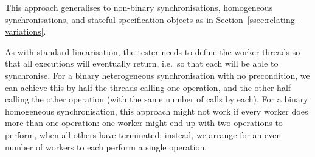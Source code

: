 
This approach generalises to non-binary synchronisations, homogeneous
synchronisations, and stateful specification objects as in
Section~\ref{ssec:relating-variations}.


As with standard linearisation, the tester needs to define the worker threads
so that all executions will eventually return, i.e.~so that each will be able
to synchronise.  For a binary heterogeneous synchronisation with no
precondition, we can achieve this by half the threads calling one operation,
and the other half calling the other operation (with the same number of calls
by each).  For a binary homogeneous synchronisation, this approach might not
work if every worker does more than one operation: one worker might end up
with two operations to perform, when all others have terminated; instead, we
arrange for an even number of workers to each perform a single operation.


